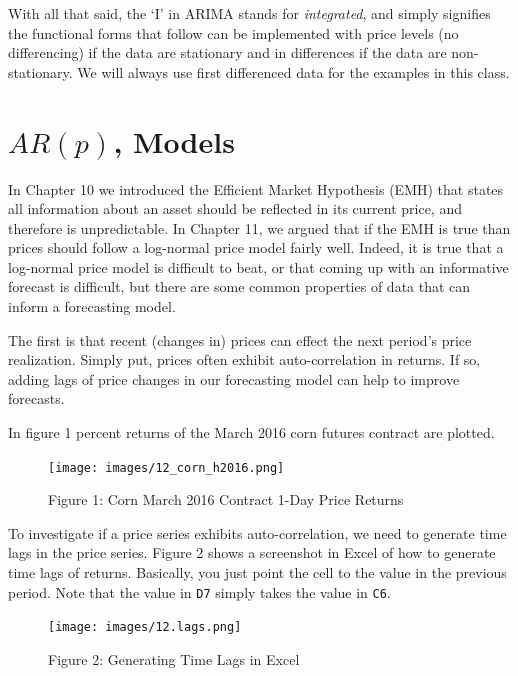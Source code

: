 \documentclass[
  letterpaper,
  DIV=11,
  numbers=noendperiod]{scrreprt}
\begin{document}
With all that said, the `I' in ARIMA stands for \emph{integrated}, and
simply signifies the functional forms that follow can be implemented
with price levels (no differencing) if the data are stationary and in
differences if the data are non-stationary. We will always use first
differenced data for the examples in this class.

\section{\texorpdfstring{\(AR(p)\),
Models}{AR(p), Models}}\label{arp-models}

In Chapter 10 we introduced the Efficient Market Hypothesis (EMH) that
states all information about an asset should be reflected in its current
price, and therefore is unpredictable. In Chapter 11, we argued that if
the EMH is true than prices should follow a log-normal price model
fairly well. Indeed, it is true that a log-normal price model is
difficult to beat, or that coming up with an informative forecast is
difficult, but there are some common properties of data that can inform
a forecasting model.

The first is that recent (changes in) prices can effect the next
period's price realization. Simply put, prices often exhibit
auto-correlation in returns. If so, adding lags of price changes in our
forecasting model can help to improve forecasts.

In figure 1 percent returns of the March 2016 corn futures contract are
plotted.

\begin{figure}[H]

{\centering \texttt{[image: images/12\_corn\_h2016.png]}

}

\caption{Figure 1: Corn March 2016 Contract 1-Day Price Returns}

\end{figure}%

To investigate if a price series exhibits auto-correlation, we need to
generate time lags in the price series. Figure 2 shows a screenshot in
Excel of how to generate time lags of returns. Basically, you just point
the cell to the value in the previous period. Note that the value in
\texttt{D7} simply takes the value in \texttt{C6}.

\begin{figure}[H]

{\centering \texttt{[image: images/12.lags.png]}

}

\caption{Figure 2: Generating Time Lags in Excel}

\end{figure}%
\end{document}
